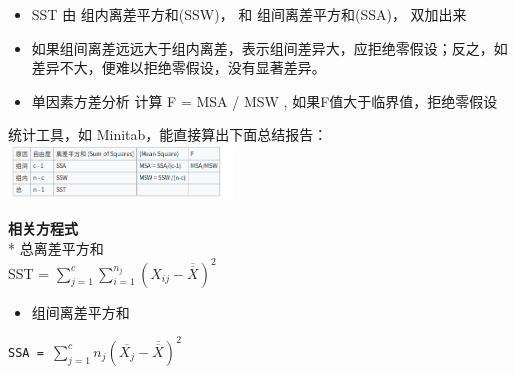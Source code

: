 \begin{description}
\begin{description}
\begin{itemize}
\tightlist
\item
  SST 由 组内离差平方和(SSW)， 和 组间离差平方和(SSA)， 双加出来
\end{itemize}

\begin{itemize}
\tightlist
\item
  如果组间离差远远大于组内离差，表示组间差异大，应拒绝零假设；反之，如差异不大，便难以拒绝零假设，没有显著差异。
\end{itemize}

\begin{itemize}
\tightlist
\item
  单因素方差分析 计算 F = MSA / MSW , 如果F值大于临界值，拒绝零假设
\end{itemize}

统计工具，如 Minitab，能直接算出下面总结报告：\\


\includegraphics[width=6cm]{Screenshotfrom2023-11-1003-46-42.png}

\textbf{相关方程式}\\
* 总离差平方和\\
SST =
\(\sum_{j=1}^c \sum_{i=1}^{n_j} (X_{ij} - \overline{\overline{X}})^2\)
\end{description}
\end{description}

\begin{description}
\item[]
\end{description}

\begin{itemize}
\tightlist
\item
  组间离差平方和\\
\end{itemize}

\texttt{SSA~=~}\(\sum_{j=1}^c n_j(\overline{X_j} - \overline{\overline{X}})^2\)

